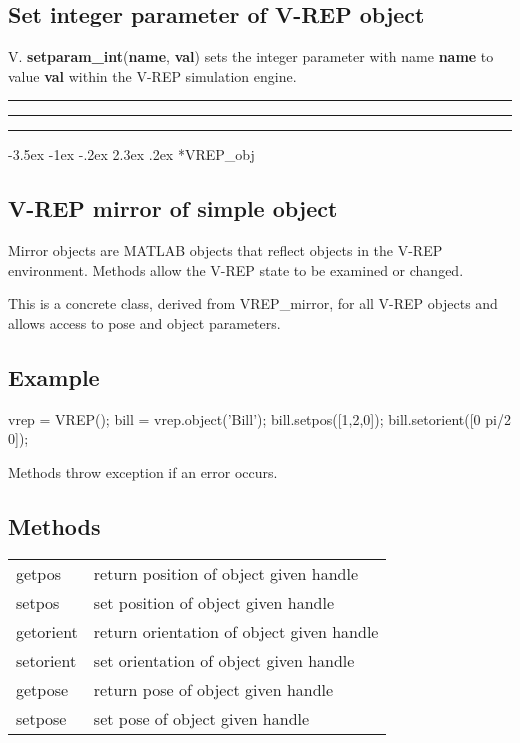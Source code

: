 \documentclass[a4paper]{article}
\makeatletter
\renewcommand\section{%
\@startsection{section}{1}{\z@}%
  {-3.5ex \@plus -1ex \@minus -.2ex}%
  {2.3ex \@plus.2ex}%
  {\color{red}\sffamily\huge\bfseries}}
\makeatother
\begin{document}
\subsection*{Set integer parameter of V-REP object}
V.\textbf{\color{red} setparam\_int}(\textbf{name}, \textbf{val}) sets the integer parameter with name \textbf{name}
to value \textbf{val} within the V-REP simulation engine.

\vspace{1.5ex}\rule{\textwidth}{1mm}
\vspace{1.5ex}\hrule
\vspace{1.5ex}\rule{\textwidth}{1mm}

\hypertarget{VREP\_obj}{\section*{VREP\_obj}}
\subsection*{V-REP mirror of simple object}
Mirror objects are MATLAB objects that reflect objects in the V-REP
environment.  Methods allow the V-REP state to be examined or changed.

This is a concrete class, derived from VREP\_mirror, for all V-REP objects
and allows access to pose and object parameters.

\subsection*{Example}
\begin{Code}
vrep = VREP();
bill = vrep.object('Bill');  %
bill.setpos([1,2,0]);
bill.setorient([0 pi/2 0]);
\end{Code}
Methods throw exception if an error occurs.

\subsection*{Methods}
\begin{tabular}{lp{120mm}}
 getpos & return position of object given handle\\ 
 setpos & set position of object given handle\\ 
 getorient & return orientation of object given handle\\ 
 setorient & set orientation of object given handle\\ 
 getpose & return pose of object given handle\\ 
 setpose & set pose of object given handle\\ 
\end{tabular}\vspace{1ex}
\end{document}
